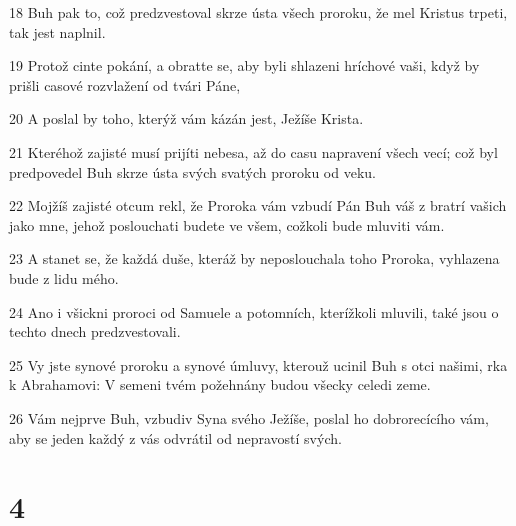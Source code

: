 \par 18 Buh pak to, což predzvestoval skrze ústa všech proroku, že mel Kristus trpeti, tak jest naplnil.
\par 19 Protož cinte pokání, a obratte se, aby byli shlazeni hríchové vaši, když by prišli casové rozvlažení od tvári Páne,
\par 20 A poslal by toho, kterýž vám kázán jest, Ježíše Krista.
\par 21 Kteréhož zajisté musí prijíti nebesa, až do casu napravení všech vecí; což byl predpovedel Buh skrze ústa svých svatých proroku od veku.
\par 22 Mojžíš zajisté otcum rekl, že Proroka vám vzbudí Pán Buh váš z bratrí vašich jako mne, jehož poslouchati budete ve všem, cožkoli bude mluviti vám.
\par 23 A stanet se, že každá duše, kteráž by neposlouchala toho Proroka, vyhlazena bude z lidu mého.
\par 24 Ano i všickni proroci od Samuele a potomních, kterížkoli mluvili, také jsou o techto dnech predzvestovali.
\par 25 Vy jste synové proroku a synové úmluvy, kterouž ucinil Buh s otci našimi, rka k Abrahamovi: V semeni tvém požehnány budou všecky celedi zeme.
\par 26 Vám nejprve Buh, vzbudiv Syna svého Ježíše, poslal ho dobrorecícího vám, aby se jeden každý z vás odvrátil od nepravostí svých.

\chapter{4}

